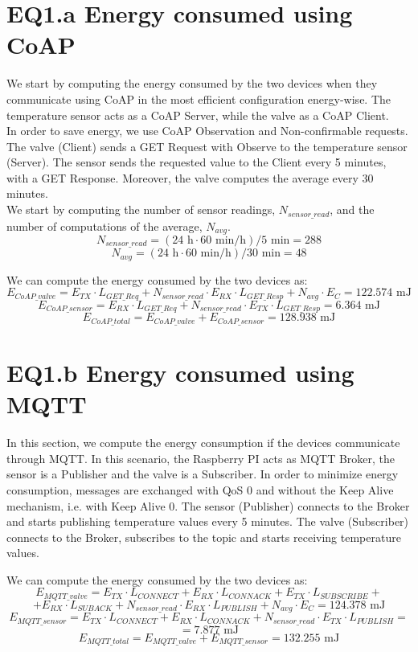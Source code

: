 \section{EQ1.a Energy consumed using CoAP}
We start by computing the energy consumed by the two devices when they communicate using CoAP in the most efficient configuration energy-wise. The temperature sensor acts as a CoAP Server, while the valve as a CoAP Client.\\
In order to save energy, we use CoAP Observation and Non-confirmable requests. The valve (Client) sends a GET Request with Observe to the temperature sensor (Server). The sensor sends the requested value to the Client every 5 minutes, with a GET Response. Moreover, the valve computes the average every 30 minutes.\\
We start by computing the number of sensor readings, $N_{sensor\_read}$, and the number of computations of the average, $N_{avg}$.
\[N_{sensor\_read} = (24\text{ h}  \cdot 60 \text{ min/h}) / 5 \text{ min} = 288\]
\[N_{avg} = (24\text{ h}  \cdot 60 \text{ min/h}) / 30 \text{ min} = 48\]

We can compute the energy consumed by the two devices as:
\[E_{CoAP\_valve} = E_{TX} \cdot L_{GET\_Req} + N_{sensor\_read} \cdot E_{RX} \cdot L_{GET\_Resp} + N_{avg} \cdot E_{C} = 122.574 \text{ mJ}\]
\[E_{CoAP\_sensor} = E_{RX} \cdot L_{GET\_Req} + N_{sensor\_read} \cdot E_{TX} \cdot L_{GET\_Resp} = 6.364 \text{ mJ}\]
\[E_{CoAP\_total} = E_{CoAP\_valve} + E_{CoAP\_sensor} = 128.938 \text{ mJ}\]

\section{EQ1.b Energy consumed using MQTT}
In this section, we compute the energy consumption if the devices communicate through MQTT. In this scenario, the Raspberry PI acts as MQTT Broker, the sensor is a Publisher and the valve is a Subscriber. In order to minimize energy consumption, messages are exchanged with QoS 0 and without the Keep Alive mechanism, i.e. with Keep Alive 0. The sensor (Publisher) connects to the Broker and starts publishing temperature values every 5 minutes. The valve (Subscriber) connects to the Broker, subscribes to the topic and starts receiving temperature values.

We can compute the energy consumed by the two devices as:
\[E_{MQTT\_valve} = E_{TX} \cdot L_{CONNECT} + E_{RX} \cdot L_{CONNACK} + E_{TX} \cdot L_{SUBSCRIBE} +\]
\[+ E_{RX} \cdot L_{SUBACK} + N_{sensor\_read} \cdot E_{RX} \cdot L_{PUBLISH} + N_{avg} \cdot E_{C} = 124.378 \text{ mJ}\]
\[E_{MQTT\_sensor} = E_{TX} \cdot L_{CONNECT} + E_{RX} \cdot L_{CONNACK} + N_{sensor\_read} \cdot E_{TX} \cdot L_{PUBLISH} =\]
\[= 7.877 \text{ mJ}\]
\[E_{MQTT\_total} = E_{MQTT\_valve} + E_{MQTT\_sensor} = 132.255 \text{ mJ}\]

